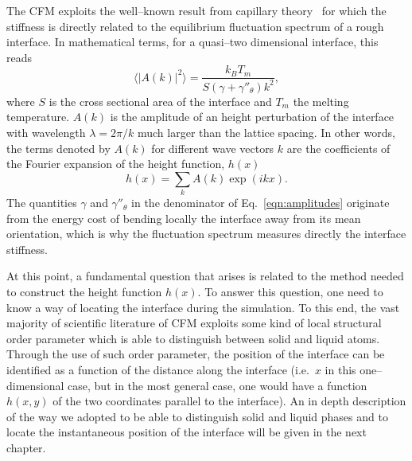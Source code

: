 The CFM exploits the well--known result from capillary theory~\cite{Karma1993} for which the stiffness is directly related to the equilibrium fluctuation spectrum of a rough interface. In mathematical terms, for a quasi--two dimensional interface, this reads
\begin{equation}
    \langle \lvert A(k) \rvert^2 \rangle = \frac{k_B T_m}{S (\gamma + \gamma''_{\theta})k^2},
    \label{eqn:amplitudes}
\end{equation}
where $S$ is the cross sectional area of the interface and $T_m$ the melting temperature. $A(k)$ is the amplitude of an height perturbation of the interface with wavelength $\lambda=2\pi/k$ much larger than the lattice spacing. In other words, the terms denoted by $A(k)$ for different wave vectors $k$ are the coefficients of the Fourier expansion of the height function, $h(x)$
\begin{equation}
    h(x)= \sum_k A(k) \exp{(i k x)}.
    \label{eqn:fourier_expansion}
\end{equation}
The quantities $\gamma$ and $\gamma''_{\theta}$ in the denominator of Eq.~\ref{eqn:amplitudes} originate from the energy cost of bending locally the interface away from its mean orientation, which is why the fluctuation spectrum measures directly the interface stiffness.

At this point, a fundamental question that arises is related to the method needed to construct the height function $h(x)$. To answer this question, one need to know a way of locating the interface during the simulation. To this end, the vast majority of scientific literature of CFM exploits some kind of local structural order parameter which is able to distinguish between solid and liquid atoms. Through the use of such order parameter, the position of the interface can be identified as a function of the distance along the interface (i.e.\ $x$ in this one--dimensional case, but in the most general case, one would have a function $h(x,y)$ of the two coordinates parallel to the interface). An in depth description of the way we adopted to be able to distinguish solid and liquid phases and to locate the instantaneous position of the interface will be given in the next chapter.

